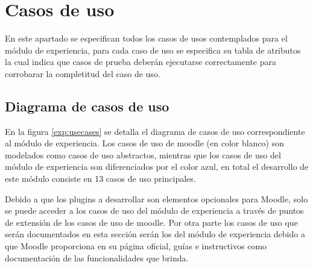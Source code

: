     
    

\clearpage
\section{Casos de uso}

 En este apartado se especifican todos los casos de usos contemplados para el módulo de
 experiencia, para cada caso de uso se especifica su tabla de atributos la cual indica que casos
 de prueba deberán ejecutarse correctamente para corrobarar la completitud del caso de uso.

\subsection{Diagrama de casos de uso}

 En la figura \ref{exp:usecases} se detalla el diagrama de casos de uso correspondiente al módulo
 de experiencia. Los casos de uso de moodle (en color blanco) son modelados como casos de uso
 abstractos, mientras que los casos de uso del módulo de experiencia son diferenciados por el
 color azul, en total el desarrollo de este módulo consiste en 13 casos de uso principales.


 \noindent
 Debido a que los plugins a desarrollar son elementos opcionales para Moodle, solo se puede
 acceder a los casos de uso del módulo de experiencia a través de puntos de extensión de los
 casos de uso de moodle. Por otra parte los casos de uso que serán documentados en esta sección
 serán los del módulo de experiencia debido a que Moodle proporciona en su página oficial, guías
 e instructivos como documentación de las funcionalidades que brinda.



